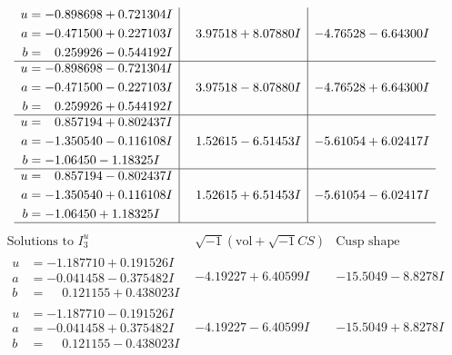 \documentclass[1p]{elsarticle_modified}
\theoremstyle{definition}
\newcommand{\I}{\sqrt{-1}}
\begin{document}
$$\begin{array}{c|c|c}
\begin{aligned}
u &= -0.898698 + 0.721304 I \\
a &= -0.471500 + 0.227103 I \\
b &= \phantom{-}0.259926 - 0.544192 I\end{aligned}
 & \phantom{-}3.97518 + 8.07880 I & -4.76528 - 6.64300 I \\ \hline\begin{aligned}
u &= -0.898698 - 0.721304 I \\
a &= -0.471500 - 0.227103 I \\
b &= \phantom{-}0.259926 + 0.544192 I\end{aligned}
 & \phantom{-}3.97518 - 8.07880 I & -4.76528 + 6.64300 I \\ \hline\begin{aligned}
u &= \phantom{-}0.857194 + 0.802437 I \\
a &= -1.350540 - 0.116108 I \\
b &= -1.06450 - 1.18325 I\end{aligned}
 & \phantom{-}1.52615 - 6.51453 I & -5.61054 + 6.02417 I \\ \hline\begin{aligned}
u &= \phantom{-}0.857194 - 0.802437 I \\
a &= -1.350540 + 0.116108 I \\
b &= -1.06450 + 1.18325 I\end{aligned}
 & \phantom{-}1.52615 + 6.51453 I & -5.61054 - 6.02417 I\\
 \hline 
 \end{array}$$\newpage$$\begin{array}{c|c|c}  
\text{Solutions to }I^u_{3}& \I (\text{vol} + \sqrt{-1}CS) & \text{Cusp shape}\\
 \hline 
\begin{aligned}
u &= -1.187710 + 0.191526 I \\
a &= -0.041458 - 0.375482 I \\
b &= \phantom{-}0.121155 + 0.438023 I\end{aligned}
 & -4.19227 + 6.40599 I & -15.5049 - 8.8278 I \\ \hline\begin{aligned}
u &= -1.187710 - 0.191526 I \\
a &= -0.041458 + 0.375482 I \\
b &= \phantom{-}0.121155 - 0.438023 I\end{aligned}
 & -4.19227 - 6.40599 I & -15.5049 + 8.8278 I \\ \hline\begin{aligned}

\end{aligned}
\end{array}$$
\end{document}
